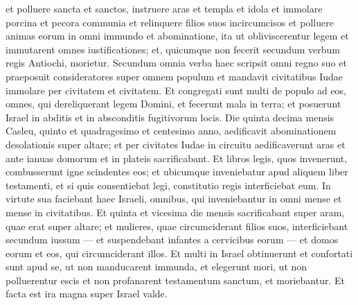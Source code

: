 \begin{biblechapter}
\verse et polluere sancta et sanctos, 
\verse instruere aras et templa et idola et immolare porcina et pecora communia  
\verse et relinquere filios suos incircumcisos et polluere animas eorum in omni immundo et abominatione, 
\verse ita ut obliviscerentur legem et immutarent omnes iustificationes; 
\verse et, quicumque non fecerit secundum verbum regis Antiochi, morietur. 
\verse Secundum omnia verba haec scripsit omni regno suo et praeposuit consideratores super omnem populum et mandavit civitatibus Iudae immolare per civitatem et civitatem. 
\verse Et congregati sunt multi de populo ad eos, omnes, qui dereliquerant legem Domini, et fecerunt mala in terra; 
\verse et posuerunt Israel in abditis et in absconditis fugitivorum locis. 
\verse Die quinta decima mensis Casleu, quinto et quadragesimo et centesimo anno, aedificavit abominationem desolationis super altare; et per civitates Iudae in circuitu aedificaverunt aras 
\verse et ante ianuas domorum et in plateis sacrificabant. 
\verse Et libros legis, quos invenerunt, combusserunt igne scindentes eos; 
\verse et ubicumque inveniebatur apud aliquem liber testamenti, et si quis consentiebat legi, constitutio regis interficiebat eum. 
\verse In virtute sua faciebant haec Israeli, omnibus, qui inveniebantur in omni mense et mense in civitatibus. 
\verse Et quinta et vicesima die mensis sacrificabant super aram, quae erat super altare; 
\verse et mulieres, quae circumciderant filios suos, interficiebant secundum iussum 
\verse — et suspendebant infantes a cervicibus eorum — et domos eorum et eos, qui circumciderant illos. 
\verse Et multi in Israel obtinuerunt et confortati sunt apud se, ut non manducarent immunda, 
\verse et elegerunt mori, ut non polluerentur escis et non profanarent testamentum sanctum, et moriebantur. 
\verse Et facta est ira magna super Israel valde. 
\end{biblechapter}

